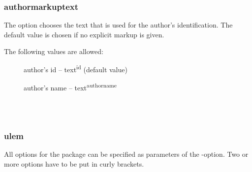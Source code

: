 \begin{chusage}
		\>\\
	\usageexample
		\> \Corresponds\ \\
		\>
\end{chusage}



\subsubsection{authormarkuptext}

The  option chooses the text that is used for the author's identification.
The default value is chosen if no explicit markup is given.

The following values are allowed:
\begin{description}
	\item [] author's id -- text\textsuperscript{id} (default value)
	\item [] author's name -- text\textsuperscript{authorname}
\end{description}

\begin{chusage}
		\>\\
	\usageexample
		\> \Corresponds\ \\
		\>
\end{chusage}



\subsubsection{ulem}

All options for the  package can be specified as parameters of the -option.
Two or more options have to be put in curly brackets.

\begin{chusage}
		\>\\
	\usageexample
		\>\\
		\>
\end{chusage}



